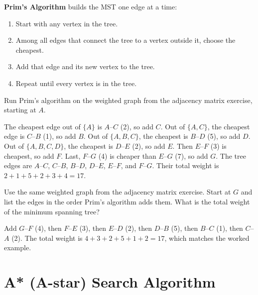 \textbf{Prim's Algorithm} builds the MST one edge at a time:
\begin{enumerate}
\item Start with any vertex in the tree.
\item Among all edges that connect the tree to a vertex outside it, choose the cheapest.
\item Add that edge and its new vertex to the tree.
\item Repeat until every vertex is in the tree.
\end{enumerate}

\begin{Worked}
\begin{Problem}
Run Prim's algorithm on the weighted graph from the adjacency matrix exercise, starting at $A$.
\end{Problem}
\begin{Solution}
The cheapest edge out of $\{A\}$ is $A$–$C$ (2), so add $C$. Out of $\{A, C\}$, the cheapest edge is $C$–$B$ (1), so add $B$. Out of $\{A, B, C\}$, the cheapest is $B$–$D$ (5), so add $D$. Out of $\{A, B, C, D\}$, the cheapest is $D$–$E$ (2), so add $E$. Then $E$–$F$ (3) is cheapest, so add $F$. Last, $F$–$G$ (4) is cheaper than $E$–$G$ (7), so add $G$. The tree edges are $A$–$C$, $C$–$B$, $B$–$D$, $D$–$E$, $E$–$F$, and $F$–$G$. Their total weight is $2 + 1 + 5 + 2 + 3 + 4 = 17$.
\end{Solution}
\end{Worked}

\begin{Exercise}[title={Prim's Algorithm from G}, label={ex:prim1}]
Use the same weighted graph from the adjacency matrix exercise. Start at $G$ and list the edges in the order Prim's algorithm adds them. What is the total weight of the minimum spanning tree?
\end{Exercise}
\begin{Answer}[ref={ex:prim1}]
Add $G$–$F$ (4), then $F$–$E$ (3), then $E$–$D$ (2), then $D$–$B$ (5), then $B$–$C$ (1), then $C$–$A$ (2). The total weight is $4 + 3 + 2 + 5 + 1 + 2 = 17$, which matches the worked example.
\end{Answer}


\section{A* (A-star) Search Algorithm}

